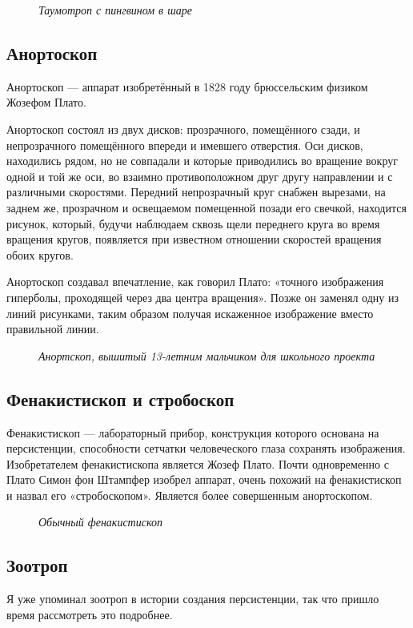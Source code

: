 \documentclass[a4paper, 12pt]{article}
\renewcommand{\sectionmark}[1]{\markright{#1}}
\newcommand{\image}[3]{
	\begin{figure}[ht]
		\center{\texttt{[image: img/\#1]} }
		\caption{\textit{#3}}\end{figure}
}
\begin{document}
\image{Пингвин.jpg}{220}{Таумотроп с пингвином в шаре}

\subsection{Анортоскоп}

Анортоскоп — аппарат изобретённый в 1828 году брюссельским
физиком Жозефом Плато.

Анортоскоп состоял из двух дисков: прозрачного, помещённого сзади, и
непрозрачного помещённого впереди и имевшего отверстия. Оси дисков,
находились рядом, но не совпадали и которые приводились во вращение
вокруг одной и той же оси, во взаимно противоположном друг другу
направлении и с различными скоростями. Передний непрозрачный круг
снабжен вырезами, на заднем же, прозрачном и освещаемом помещенной
позади его свечкой, находится рисунок, который, будучи наблюдаем сквозь
щели переднего круга во время вращения кругов, появляется при известном
отношении скоростей вращения обоих кругов.

Анортоскоп создавал впечатление, как говорил Плато: «точного изображения
гиперболы, проходящей через два центра вращения». Позже он заменял одну
из линий рисунками, таким образом получая искаженное изображение вместо
правильной линии.

\image{С мышкой.jpg}{200}{Анортскоп, вышитый 13-летним мальчиком для школьного проекта}

\thispagestyle{fancy}
\renewcommand{\sectionmark}[1]{\markright{#1}}
\fancyhf{}
\fancyhead[R]{\bfseries\thepage}
\subsection{Фенакистископ и стробоскоп}
Фенакистископ — лабораторный прибор, конструкция которого
основана на персистенции, способности сетчатки человеческого глаза
сохранять изображения. Изобретателем фенакистископа является Жозеф
Плато. Почти одновременно с Плато Симон фон Штампфер изобрел аппарат,
очень похожий на фенакистископ и назвал его «стробоскопом». Является
более совершенным анортоскопом.

\image{Фенакистископ.jpg}{220}{Обычный фенакистископ}

\subsection{Зоотроп}
Я уже упоминал зоотроп в истории создания персистенции, так что
пришло время рассмотреть это подробнее.
\end{document}
